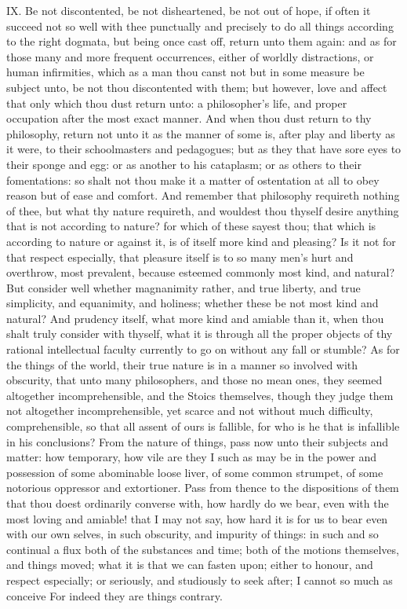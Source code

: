 IX. Be not discontented, be not disheartened, be not out of hope, if
often it succeed not so well with thee punctually and precisely to do all
things according to the right dogmata, but being once cast off, return
unto them again: and as for those many and more frequent occurrences,
either of worldly distractions, or human infirmities, which as a man thou
canst not but in some measure be subject unto, be not thou discontented
with them; but however, love and affect that only which thou dust return
unto: a philosopher's life, and proper occupation after the most exact
manner. And when thou dust return to thy philosophy, return not unto it as
the manner of some is, after play and liberty as it were, to their
schoolmasters and pedagogues; but as they that have sore eyes to their
sponge and egg: or as another to his cataplasm; or as others to their
fomentations: so shalt not thou make it a matter of ostentation at all to
obey reason but of ease and comfort. And remember that philosophy
requireth nothing of thee, but what thy nature requireth, and wouldest
thou thyself desire anything that is not according to nature? for which of
these sayest thou; that which is according to nature or against it, is of
itself more kind and pleasing? Is it not for that respect especially, that
pleasure itself is to so many men's hurt and overthrow, most prevalent,
because esteemed commonly most kind, and natural? But consider well
whether magnanimity rather, and true liberty, and true simplicity, and
equanimity, and holiness; whether these be not most kind and natural? And
prudency itself, what more kind and amiable than it, when thou shalt truly
consider with thyself, what it is through all the proper objects of thy
rational intellectual faculty currently to go on without any fall or
stumble? As for the things of the world, their true nature is in a manner
so involved with obscurity, that unto many philosophers, and those no mean
ones, they seemed altogether incomprehensible, and the Stoics themselves,
though they judge them not altogether incomprehensible, yet scarce and not
without much difficulty, comprehensible, so that all assent of ours is
fallible, for who is he that is infallible in his conclusions? From the
nature of things, pass now unto their subjects and matter: how temporary,
how vile are they I such as may be in the power and possession of some
abominable loose liver, of some common strumpet, of some notorious
oppressor and extortioner. Pass from thence to the dispositions of them
that thou doest ordinarily converse with, how hardly do we bear, even with
the most loving and amiable! that I may not say, how hard it is for us to
bear even with our own selves, in such obscurity, and impurity of things:
in such and so continual a flux both of the substances and time; both of
the motions themselves, and things moved; what it is that we can fasten
upon; either to honour, and respect especially; or seriously, and
studiously to seek after; I cannot so much as conceive For indeed they are
things contrary.

